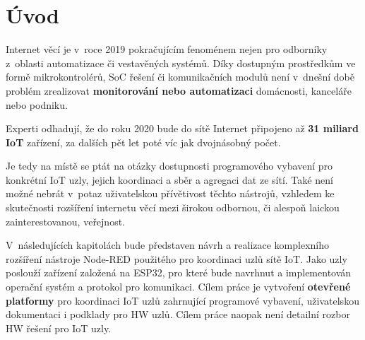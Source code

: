 \chapter{Úvod}
\label{ch:uvod}

Internet věcí je v~roce 2019 pokračujícím fenoménem nejen pro odborníky z~oblasti automatizace či vestavěných systémů. Díky dostupným prostředkům ve formě mikrokontrolérů, SoC řešení či komunikačních modulů není v~dnešní době problém zrealizovat \textbf{monitorování nebo automatizaci} domácnosti, kanceláře nebo podniku.

Experti odhadují, že do roku 2020 bude do sítě Internet připojeno až \textbf{31 miliard IoT} zařízení, za dalších pět let poté víc jak dvojnásobný počet. 

Je tedy na místě se ptát na otázky dostupnosti programového vybavení pro konkrétní IoT uzly, jejich koordinaci a sběr a agregaci dat ze sítí. Také není možné nebrát v~potaz uživatelskou přívětivost těchto nástrojů, vzhledem ke skutečnosti rozšíření internetu věcí mezi širokou odbornou, či alespoň laickou zainterestovanou, veřejnost.

V~následujících kapitolách bude představen návrh a realizace komplexního rozšíření nástroje Node-RED použitého pro koordinaci uzlů sítě IoT. Jako uzly poslouží zařízení založená na ESP32, pro které bude navrhnut a implementován operační systém a protokol pro komunikaci. Cílem práce je vytvoření \textbf{otevřené platformy} pro koordinaci IoT uzlů zahrnující programové vybavení, uživatelskou dokumentaci i podklady pro HW uzlů. Cílem práce naopak není detailní rozbor HW řešení pro IoT uzly.   


\cite{ESP32Datasheet}